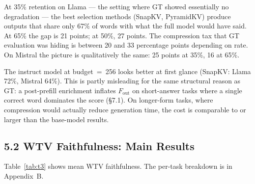 \documentclass[10pt,letterpaper]{article}
\begin{document}
At 35\% retention on Llama --- the setting where GT showed essentially no degradation ---
the best selection methods (SnapKV, PyramidKV) produce outputs that share only 67\% of
words with what the full model would have said. At 65\% the gap is 21 points; at 50\%,
27 points. The compression tax that GT evaluation was hiding is between 20 and 33
percentage points depending on rate. On Mistral the picture is qualitatively the same:
25 points at 35\%, 16 at 65\%.

The instruct model at budget~=~256 looks better at first glance (SnapKV: Llama 72\%,
Mistral 64\%). This is partly misleading for the same structural reason as GT: a
post-prefill enrichment inflates \(F_{\text{out}}\) on short-answer tasks
where a single correct word dominates the score (§7.1). On longer-form tasks, where
compression would actually reduce generation time, the cost is comparable to or larger
than the base-model results.

\hypertarget{kl-faithfulness-main-results}{%
\subsection{5.2 WTV Faithfulness: Main Results}\label{wtv-faithfulness-main-results}}
Table~\ref{tab:t3} shows mean WTV faithfulness. The per-task breakdown is in Appendix~B.
\end{document}
